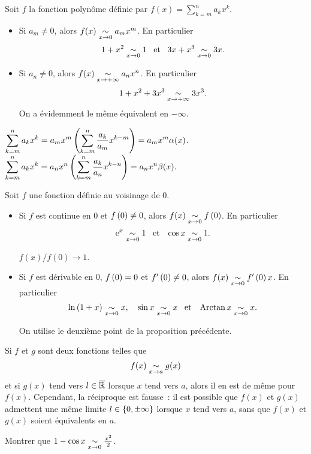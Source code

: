 \documentclass{magnolia}
\begin{document}
\begin{remarques}
\remarque Soit $f$ la fonction polynôme définie par $f(x)=\sum_{k=m}^n a_k x^k$.
  \begin{itemize}
  \item Si $a_m \neq 0$, alors
    $f(x) \underset{x\rightarrow 0}{\sim} a_m x^m$.
    En particulier \[1+x^2\underset{x\rightarrow 0}{\sim}1 \quad\!\text{et}\quad\! 3x+x^3\underset{x\rightarrow 0}{\sim}3x.\]
  \item Si $a_n \neq 0$, alors $f(x) \underset{x\rightarrow +\infty}{\sim} a_n x^n$.
    En particulier \[1+x^2+3x^3\underset{x\rightarrow +\infty}{\sim}3x^3.\]
    On a évidemment le même équivalent en $-\infty$.
  \end{itemize}
  \begin{sol}
  $\displaystyle \sum_{k=m}^n a_k x^k=a_mx^m\left(\sum_{k=m}^n \dfrac{a_k}{a_m} x^{k-m}\right)=a_mx^m\alpha(x)$.\\
  $\displaystyle \sum_{k=m}^n a_k x^k=a_nx^n\left(\sum_{k=m}^n \dfrac{a_k}{a_n} x^{k-n}\right)=a_nx^n\beta(x).$
  
  \end{sol}
\remarque Soit $f$ une fonction définie au voisinage de 0.
  \begin{itemize}
  \item Si $f$ est continue en 0 et $f\left(0\right)\neq 0$, alors
    $f(x)\underset{x\rightarrow 0}{\sim}f\left(0\right)$.
    En particulier \[{\rm e}^x\underset{x\rightarrow 0}{\sim}1 \quad\!\text{et}\quad\! \cos x\underset{x\rightarrow 0}{\sim}1.\]
    \begin{sol}
    $f(x)/f(0)\to 1$.
    \end{sol}
  \item Si $f$ est dérivable en 0, $f\left(0\right)=0$ et $f'\left(0\right)\neq 0$, alors
    $f(x)\underset{x\rightarrow 0}{\sim}f'\left(0\right)x$. En particulier
    \[\ln\left(1+x\right)\underset{x\rightarrow 0}{\sim}x, \quad \sin x\underset{x\rightarrow 0}{\sim} x \quad\!\text{et}\quad\!
      \operatorname{Arctan} x \underset{x\rightarrow 0}{\sim}x.\]
      \begin{sol}
      On utilise le deuxième point de la proposition précédente.
      \end{sol}
  \end{itemize}
\remarque Si $f$ et $g$ sont deux fonctions telles que
  \[f(x)\underset{x\rightarrow a}{\sim}g(x)\]
  et si $g(x)$ tend vers $l\in\overline{\mathbb{R}}$ lorsque $x$ tend vers $a$, alors il en
  est de même pour $f(x)$.
  Cependant, la réciproque est fausse~: il est possible que $f(x)$ et
  $g(x)$ admettent une même limite $l\in\left\{0,\pm\infty\right\}$ lorsque $x$ tend
  vers $a$, sans que $f(x)$
  et $g(x)$ soient équivalents en $a$.
\end{remarques}

\begin{exoUnique}
\exo Montrer que $1-\cos x\underset{x\rightarrow 0}{\sim}\frac{x^2}{2}$.
\end{exoUnique}
\end{document}
